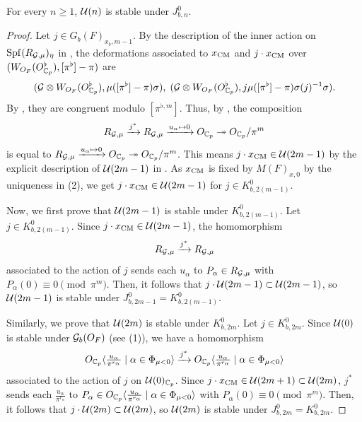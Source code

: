 \documentclass[12pt,reqno]{amsart}
\begin{document}
\begin{prop} \label{prop:U(n)_stability}
    For every $n \geq 1$, ${\mathcal{U}}(n)$ is stable under $J^0_{b, n}$. 
\end{prop}
\begin{proof}
    Let $j \in G_b(F)_{x_b, m-1}$. By the description of the inner action on ${\operatorname{Spf}}(R_{{\mathcal{G}}, \mu})_\eta$ in \cite[Proposition 2.15]{Tak25z}, the deformations associated to $x_{\operatorname{CM}}$ and $j \cdot x_{\operatorname{CM}}$ over $(W_{O_F}(O_{\mathbb{C}_p}^\flat), [\pi^\flat] - \pi)$ are
    \[
        ({\mathcal{G}} \otimes W_{O_F}(O_{\mathbb{C}_p}^\flat), \mu([\pi^\flat] - \pi) \sigma) ,\;
        ({\mathcal{G}} \otimes W_{O_F}(O_{\mathbb{C}_p}^\flat), j \mu([\pi^\flat] - \pi) \sigma(j)^{-1} \sigma). 
    \]
    By , they are congruent modulo $[\pi^{\flat, m}]$. Thus, by , the composition
    \[
        R_{{\mathcal{G}},\mu} \xrightarrow{j^*} R_{{\mathcal{G}},\mu} \xrightarrow{u_\alpha \mapsto 0} O_{\mathbb{C}_p} \twoheadrightarrow O_{\mathbb{C}_p}/\pi^m
    \]
    is equal to $R_{{\mathcal{G}},\mu} \xrightarrow{u_\alpha \mapsto 0} O_{\mathbb{C}_p} \twoheadrightarrow O_{\mathbb{C}_p}/\pi^m$. This means $j \cdot x_{\operatorname{CM}} \in {\mathcal{U}}(2m - 1)$ by the explicit description of ${\mathcal{U}}(2m - 1)$ in . As $x_{\operatorname{CM}}$ is fixed by $M(F)_{x, 0}$ by the uniqueness in  (2), we get $j \cdot x_{\operatorname{CM}} \in {\mathcal{U}}(2m - 1)$ for $j \in K^0_{b, 2(m-1)}$. 

    Now, we first prove that ${\mathcal{U}}(2m - 1)$ is stable under $K^0_{b, 2(m-1)}$. Let $j \in K^0_{b, 2(m-1)}$. Since $j \cdot x_{\operatorname{CM}} \in {\mathcal{U}}(2m - 1)$, the homomorphism
    \[
        R_{{\mathcal{G}},\mu} \xrightarrow{j^*} R_{{\mathcal{G}},\mu}
    \]
    associated to the action of $j$ sends each $u_\alpha$ to $P_\alpha \in R_{{\mathcal{G}}, \mu}$ with $P_\alpha(0) \equiv 0 \pmod{\pi^m}$. Then, it follows that $j \cdot {\mathcal{U}}(2m - 1) \subset {\mathcal{U}}(2m - 1)$, so ${\mathcal{U}}(2m - 1)$ is stable under $J^0_{b, 2m-1} = K^0_{b, 2(m-1)}$.  

    Similarly, we prove that ${\mathcal{U}}(2m)$ is stable under $K^0_{b, 2m}$. Let $j \in K^0_{b, 2m}$. Since ${\mathcal{U}}(0)$ is stable under ${\mathcal{G}}_b(O_F)$ (see  (1)), we have a homomorphism 
    \[  
        O_{\mathbb{C}_p} \langle \tfrac{u_\alpha}{\pi^{r_\alpha}} \mid \alpha \in \Phi_{\mu < 0} \rangle \xrightarrow{j^*} O_{\mathbb{C}_p} \langle \tfrac{u_\alpha}{\pi^{r_\alpha}} \mid \alpha \in \Phi_{\mu < 0} \rangle
    \]  
    associated to the action of $j$ on ${\mathcal{U}}(0)_{\mathbb{C}_p}$. Since $j \cdot x_{\operatorname{CM}} \in {\mathcal{U}}(2m + 1) \subset {\mathcal{U}}(2m)$, $j^*$ sends each $\tfrac{u_\alpha}{\pi^{r_\alpha}}$ to $P_\alpha \in O_{\mathbb{C}_p} \langle \tfrac{u_\alpha}{\pi^{r_\alpha}} \mid \alpha \in \Phi_{\mu < 0} \rangle$ with $P_\alpha(0) \equiv 0 \pmod{\pi^m}$. Then, it follows that $j \cdot {\mathcal{U}}(2m) \subset {\mathcal{U}}(2m)$, so ${\mathcal{U}}(2m)$ is stable under $J^0_{b, 2m} = K^0_{b, 2m}$. 
\end{proof}
\end{document}
